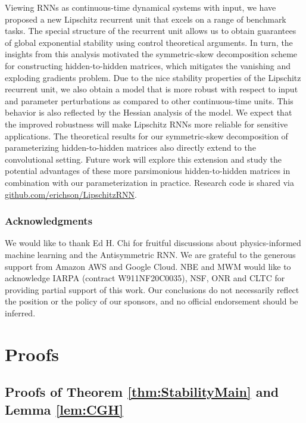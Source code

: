 \documentclass{article} \usepackage{iclr2021_conference,times}
\begin{document}
Viewing RNNs as continuous-time dynamical systems with input, we have proposed a new Lipschitz recurrent unit that excels on a range of benchmark tasks. 
The special structure of the recurrent unit allows us to obtain guarantees of global exponential stability using control theoretical arguments. 
In turn, the insights from this analysis motivated the symmetric-skew decomposition scheme for constructing hidden-to-hidden matrices, which mitigates the vanishing and exploding gradients problem.
Due to the nice stability properties of the Lipschitz recurrent unit, we also obtain a model that is more robust with respect to input and parameter perturbations as compared to other continuous-time units. 
This behavior is also reflected by the Hessian analysis of the model. 
We expect that the improved robustness will make Lipschitz RNNs more reliable for sensitive applications.
The theoretical results for our symmetric-skew decomposition of parameterizing hidden-to-hidden matrices also directly extend to the convolutional setting. Future work will explore this extension and study the potential advantages of these more parsimonious hidden-to-hidden matrices in combination with our parameterization in practice.
Research code is shared via \href{https://github.com/erichson/LipschitzRNN}{github.com/erichson/LipschitzRNN}.


\clearpage
\subsubsection*{Acknowledgments}
We would like to thank Ed H. Chi for fruitful discussions about physics-informed machine learning and the Antisymmetric RNN.
We are grateful to the generous support from Amazon AWS and Google Cloud.
NBE and MWM would like to acknowledge IARPA (contract W911NF20C0035), NSF, ONR and CLTC for providing partial support of this work. Our conclusions do not necessarily reflect the position or the policy of our sponsors, and no official endorsement should be inferred.





\clearpage
\appendix


\section{Proofs}

\subsection{Proofs of Theorem \ref{thm:StabilityMain} and Lemma \ref{lem:CGH}}
\label{sxn:proof_of_first_thm}
\end{document}
